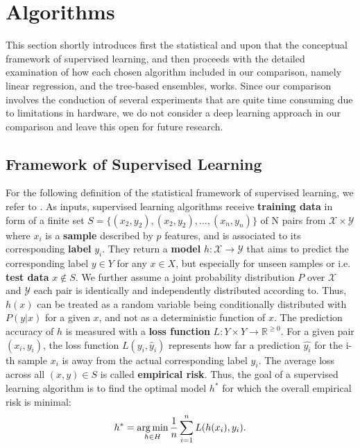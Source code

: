 \section{Algorithms}
This section shortly introduces first the statistical  and upon that the conceptual framework of supervised learning, and then proceeds with the detailed examination of how each chosen algorithm included in our comparison, namely linear regression, and the tree-based ensembles, works. Since our comparison involves the conduction of several experiments that are quite time consuming due to limitations in hardware, we do not consider a deep learning approach in our comparison and leave this open for future research.

\subsection{Framework of Supervised Learning}

For the following definition of the statistical framework of supervised learning, we refer to \cite{SLFoundations}. As inputs, supervised learning algorithms receive \textbf{training data} in form of a finite set $ S = \{({x}_{2}, y_2), ({x}_{2}, y_2), \dots, ({x}_{n}, y_n)\}$ of N pairs from $ \mathcal{X} \times \mathcal{Y} $ where $ x_i $ is a \textbf{sample} described by $ p $ features, and is associated to its corresponding \textbf{label} $ y_i $.
They return a \textbf{model} $ h: \mathcal{X} \to \mathcal{Y} $ that aims to predict the corresponding label $ y \in Y $ for any $ x \in X $, but especially for unseen samples or i.e. \textbf{test data} $ x \notin S $.
We further assume a joint probability distribution $ P $ over $ \mathcal{X} $ and $ \mathcal{Y} $ each pair is identically and independently distributed according to. 
Thus, $ h(x) $ can be treated as a random variable being conditionally distributed with $ P(y | x) $ for a given $ x $, and not as a deterministic function of $ x $. 
The prediction accuracy of $ h $ is measured with a  \textbf{loss function} $ L : Y \times Y \to \mathbb{R}^{\geq 0}$.
For a given pair $ ({x}_i, y_i) $, the loss function $ L(y_i, \hat{y}_i) $ represents how far a prediction $ \hat{y_i} $ for the i-th sample $ x_i $ is away from the actual corresponding label $ y_i $. 
The average loss across all $ (x,y) \in S $ is called \textbf{empirical risk}.
Thus, the goal of a supervised learning algorithm is to find the optimal model $ h^* $ for which the overall empirical risk is minimal: 
\begin{equation}
	h^* = \operatorname*{arg\,min}_{h \in H} \dfrac{1}{n} \sum_{i=1}^{n} L(h(x_i), y_i).
\end{equation}

